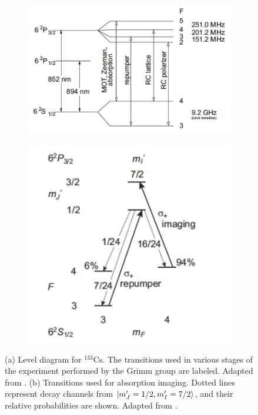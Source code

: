 \documentclass[prl,onecolumn,amsmath,amssymb,titlepage,nofootinbib,preprint]{revtex4-1}
\begin{document}
	\begin{figure}
		\centering
		\begin{subfigure}[b]{0.45\textwidth}
			\caption{}
			\includegraphics[width=\textwidth]{Figures/Cs_level_diagram}
			\label{fig:Cs_level_diagram}
		\end{subfigure}
		\begin{subfigure}[b]{0.29\textwidth}
			\caption{}
			\includegraphics[width=\textwidth]{Figures/Imaging_Transitions}
			\label{fig:imaging_transitions}
		\end{subfigure}
		\caption{(a) Level diagram for $^{133}\text{Cs}$.  The transitions used in various stages of the experiment performed by the Grimm group are labeled.  Adapted from \cite{Herbig2005}. (b) Transitions used for absorption imaging.  Dotted lines represent decay channels from $\ket{m'_{J}=1/2,m'_{I}=7/2}$, and their relative probabilities are shown. Adapted from \cite{Berninger2011_thesis}.}
	\end{figure}
\end{document}

